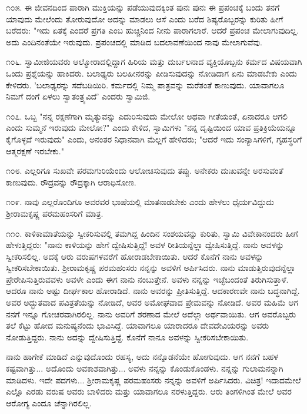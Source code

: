 ೧೦೫. ಈ ಜೀವನದಿಂದ ಪಾರಾಗಿ ಮುಕ್ತಿಯನ್ನು ಪಡೆಯುವುದಕ್ಕಿಂತ ಪುನಃ ಪುನಃ ಈ ಪ್ರಪಂಚಕ್ಕೆ ಬಂದು ತನಗೆ ಯಾವುದು ಮೇಲೆಂದು ತೋರುವುದೋ ಅದನ್ನು ಮಾಡಲು ಆಸೆ ಎಂದು ಬರೆದ ಶಿಷ್ಯರೊಬ್ಬರನ್ನು ಕುರಿತು ಹೀಗೆ ಬರೆದರು: "ಇದು ಏತಕ್ಕೆ ಎಂದರೆ ಪ್ರಗತಿ ಎಂಬ ಹುಚ್ಚಿನಿಂದ ನೀನು ಪಾರಾಗಲಾರೆ. ಆದರೆ ಪ್ರಪಂಚ ಮೇಲಾಗುವುದಿಲ್ಲ. ಅದು ಎಂದಿನಂತೆಯೇ ಇರುವುದು. ಪ್ರಪಂಚದಲ್ಲಿ ಮಾಡಿದ ಬದಲಾವಣೆಯಿಂದ ನಾವು ಮೇಲಾಗುವೆವು.

೧೦೬. ಸ್ವಾಮೀಜಿಯವರು ಆಲ್ಮೋರಾದಲ್ಲಿದ್ದಾಗ ಹಿರಿಯ ಮತ್ತು ದುರ್ಬಲನಾದ ವ್ಯಕ್ತಿಯೊಬ್ಬನು ಕರ್ಮದ ವಿಷಯವಾಗಿ ಒಂದು ಪ್ರಶ್ನೆಯನ್ನು ಹಾಕಿದರು. ಬಲಾಢ್ಯರು ಬಲಹೀನರನ್ನು ಪೀಡಿಸುವುದನ್ನು ನೋಡಿದಾಗ ಏನು ಮಾಡಬೇಕು ಎಂದು ಕೇಳಿದರು. 'ಬಲಾಢ್ಯರನ್ನು ಸದೆಬಡಿಯಿರಿ. ಕರ್ಮದಲ್ಲಿ ನಿಮ್ಮ ಪಾತ್ರವನ್ನು ಮರೆತಂತೆ ಕಾಣುವುದು. ಯಾವಾಗಲೂ ನಿಮಗೆ ದಂಗೆ ಏಳಲು ಸ್ವಾತಂತ್ರ್ಯವಿದೆ' ಎಂದರು ಸ್ವಾಮಿಜಿ.

೧೦೭. ಒಬ್ಬ "ನನ್ನ ರಕ್ಷಣೆಗಾಗಿ ಮೃತ್ಯುವನ್ನು ಎದುರಿಸುವುದು ಮೇಲೋ ಅಥವಾ ಗೀತೆಯಂತೆ, ಏನಾದರೂ ಆಗಲಿ ಎಂದು ಸುಮ್ಮನೆ ಇರುವುದು ಮೇಲೋ?" ಎಂದು ಕೇಳಿದ, ಸ್ವಾಮಿಗಳು "ನನ್ನ ದೃಷ್ಟಿಯಿಂದ ಯಾವ ಪ್ರತಿಕ್ರಿಯೆಯನ್ನೂ ಕೈಗೊಳ್ಳದೆ ಇರುವುದು" ಎಂದು, ಅನಂತರ ನಿಧಾನವಾಗಿ ಮೆಲ್ಲಗೆ ಹೇಳಿದರು; "ಆದರೆ ಇದು ಸಂನ್ಯಾಸಿಗಳಿಗೆ, ಗೃಹಸ್ಥರಿಗೆ ಆತ್ಮರಕ್ಷಣೆ ಇರಬೇಕು."

೧೦೮. ಎಲ್ಲರಿಗೂ ಸುಖವೇ ಪರಮಗುರಿಯೆಂದು ಆಲೋಚಿಸುವುದು ತಪ್ಪು. ಅನೇಕರು ದುಃಖವನ್ನೇ ಅರಸುವಂತೆ ಕಾಣುವುದು. ರೌದ್ರವನ್ನು ರೌದ್ರಕ್ಕಾಗಿ ಆರಾಧಿಸೋಣ.

೧೦೯. ನಾವು ಎಲ್ಲರೊಂದಿಗೂ ಅವರವರ ಭಾಷೆಯಲ್ಲಿ ಮಾತನಾಡಬೇಕು ಎಂದು ಹೇಳಲು ಧೈರ್ಯವಿದ್ದುದು ಶ‍್ರೀರಾಮಕೃಷ್ಣ ಪರಮಹಂಸರಿಗೆ ಮಾತ್ರ.

೧೧೦. ಕಾಳಿಕಾಮಾತೆಯನ್ನು ಸ್ವೀಕರಿಸುವಲ್ಲಿ ತಮಗಿದ್ದ ಹಿಂದಿನ ಸಂಶಯವನ್ನು ಕುರಿತು, ಸ್ವಾಮಿ ವಿವೇಕಾನಂದರು ಹೀಗೆ ಹೇಳುತ್ತಿದ್ದರು: "ನಾನು ಕಾಳಿಯನ್ನು ಹೇಗೆ ದ್ವೇಷಿಸುತ್ತಿದ್ದೆ! ಅವಳ ರೀತಿಯನ್ನೆಲ್ಲಾ ದ್ವೇಷಿಸುತ್ತಿದ್ದೆ. ನಾನು ಅವಳನ್ನು ಸ್ವೀಕರಿಸಲಿಲ್ಲ. ಅದಕ್ಕೆ ಆರು ವರುಷಗಳವರೆಗೆ ಹೋರಾಡಬೇಕಾಯಿತು. ಆದರೆ ಕೊನೆಗೆ ನಾನು ಅವಳನ್ನು ಸ್ವೀಕರಿಸಬೇಕಾಯಿತು. ಶ‍್ರೀರಾಮಕೃಷ್ಣ ಪರಮಹಂಸರು ನನ್ನನ್ನು ಅವಳಿಗೆ ಅರ್ಪಿಸಿದರು. ನಾನು ಮಾಡುತ್ತಿರುವುದನ್ನೆಲ್ಲಾ ಪ್ರೇರೇಪಿಸುತ್ತಿರುವವಳು ಅವಳೇ ಎಂದು ಈಗ ನಾನು ನಂಬುತ್ತೇನೆ. ಅವಳು ನನ್ನನ್ನು ಇಚ್ಛೆಬಂದಂತೆ ತಿರುಗಿಸುತ್ತಾಳೆ. ಆದರೂ ನಾನು ಅಷ್ಟು ದೀರ್ಘಕಾಲ ಹೋರಾಡಿದೆ. ನಾನು ಅವರನ್ನು ಪ್ರೀತಿಸುತ್ತಿದ್ದೆ. ಆದಕಾರಣವೇ ನಾನು ಬದ್ಧನಾಗಿದ್ದೆ. ಅವರ ಅದ್ಭುತವಾದ ಪವಿತ್ರತೆಯನ್ನು ನೋಡಿದೆ, ಅವರ ಅಮೋಘವಾದ ಪ್ರೇಮವನ್ನು ನೋಡಿದೆ. ಅವರ ಮಹಿಮೆ ಆಗ ನನಗೆ ಇನ್ನೂ ಗೋಚರವಾಗಿರಲಿಲ್ಲ. ನಾನು ಅವರಿಗೆ ಶರಣಾದ ಮೇಲೆ ಅದೆಲ್ಲಾ ಅರ್ಥವಾಯಿತು. ಆಗ ಅವರೊಬ್ಬರು ತಲೆ ಕೆಟ್ಟು ಹೋದ ಮನುಷ್ಯನೆಂದು ಭಾವಿಸಿದ್ದೆ. ಯಾವಾಗಲೂ ಯಾರಾದರೂ ದೇವದೇವಿಯರನ್ನು ಅವರು ನೋಡುತ್ತಿದ್ದರು. ನಾನು ಅದನ್ನು ದ್ವೇಷಿಸುತ್ತಿದ್ದೆ. ಕೊನೆಗೆ ನಾನೂ ಅವಳನ್ನು ಸ್ವೀಕರಿಸಬೇಕಾಯಿತು.

ನಾನು ಹಾಗೇಕೆ ಮಾಡಿದೆ ಎನ್ನುವುದೊಂದು ರಹಸ್ಯ, ಅದು ನನ್ನೊಡನೆಯೇ ಹೋಗುವುದು. ಆಗ ನನಗೆ ಬಹಳ ಕಷ್ಟವಾಗಿತ್ತು... ಅದೊಂದು ಅವಕಾಶವಾಗಿತ್ತು... ಅವಳು ನನ್ನನ್ನು ಕೊಂಡುಕೊಂಡಳು. ನನ್ನನ್ನು ಗುಲಾಮನನ್ನಾಗಿ ಮಾಡಿದಳು. ಇದೇ ಪದಗಳು... ಶ‍್ರೀರಾಮಕೃಷ್ಣ ಪರಮಹಂಸರು ನನ್ನನ್ನು ಅವಳಿಗೆ ಅರ್ಪಿಸಿದರು. ವಿಚಿತ್ರ! ಇದಾದಮೇಲೆ ಎಲ್ಲೊ ಎರಡು ವರುಷ ಅವರು ಬಾಳಿದರು ಮತ್ತು ಯಾವಾಗಲೂ ನರಳುತ್ತಿದ್ದರು. ಆರು ತಿಂಗಳಿಗಿಂತ ಮೇಲೆ ಅವರ ಆರೋಗ್ಯ ಎಂದೂ ಚೆನ್ನಾಗಿರಲಿಲ್ಲ.

